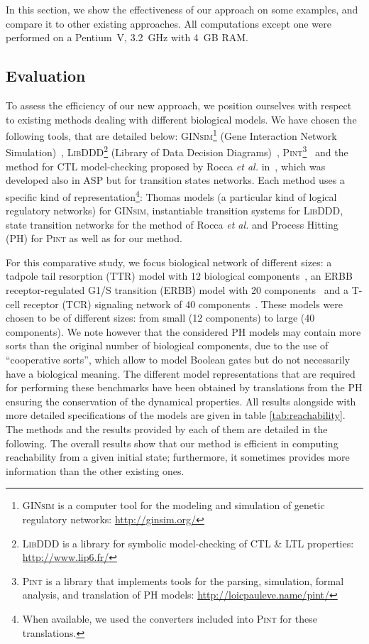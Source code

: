 In this section, we show the effectiveness of our approach on some examples,
and compare it to other existing approaches.
All computations except one were performed on a Pentium~V, 3.2~GHz with 4~GB RAM.

\subsection{Evaluation}
To assess the efficiency of our new approach,
we position ourselves with respect to existing methods dealing with different biological models.
We have chosen the following tools, that are detailed below: 
\textsc{GINsim}\footnote{\textsc{GINsim} is a computer tool for the modeling and simulation of genetic regulatory networks: \url{http://ginsim.org/}} (Gene Interaction Network Simulation)~\cite{gonzalez2006ginsim,naldi2009logical,naldi2007decision},
\textsc{LibDDD}\footnote{\textsc{LibDDD} is a library for symbolic model-checking of CTL \& LTL properties: \url{http://www.lip6.fr/}}
(Library of Data Decision Diagrams)~\cite{thierry2009hierarchical,colange2013towards},
\textsc{Pint}\footnote{\textsc{Pint} is a library that implements tools for the parsing, simulation, formal analysis, and translation of PH models: \url{http://loicpauleve.name/pint/}}~\cite{PMR12-MSCS}
and the method for CTL model-checking proposed by Rocca \textit{et al.} in~\cite{roccaasp},
which was developed also in ASP but for transition states networks.
Each method uses a specific kind of representation\footnote{When available, we used the converters included into \textsc{Pint} for these translations.}:
Thomas models (a particular kind of logical regulatory networks) for \textsc{GINsim},
instantiable transition systems for \textsc{LibDDD},
state transition networks for the method of Rocca \textit{et al.}
and Process Hitting (PH) for \textsc{Pint} as well as for our method.

For this comparative study, we focus biological network of different sizes:
a tadpole tail resorption (TTR) model with 12 biological components~\cite{khalis2009smbionet},
an ERBB receptor-regulated G1/S transition (ERBB) model with 20 components~\cite{Samaga2009}
and a T-cell receptor (TCR) signaling network of 40 components~\cite{Klamt06}.
These models were chosen to be of different sizes:
from small (12 components) to large (40 components).
We note however that the considered PH models may contain more sorts than
the original number of biological components, due to the use of
“cooperative sorts”, which allow to model Boolean gates but do not necessarily
have a biological meaning.
The different model representations that are required for performing these benchmarks have been obtained by translations
from the PH
ensuring the conservation of the dynamical properties.
All results alongside with more detailed specifications of the models
are given in table \ref{tab:reachability}.
The methods and the results provided by each of them are detailed in the following.
The overall results show that our method is efficient in computing reachability
from a given initial state;
furthermore, it sometimes provides more information than the other existing ones.

